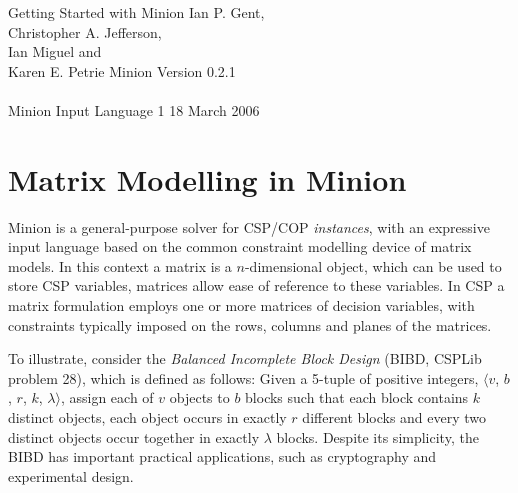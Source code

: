 \documentclass{article}
\begin{document}

\newpage

\pagestyle{empty}
\begin{center}
\vfill
{\LARGE Getting Started with {\sc Minion}}
\vfill
{\large Ian P. Gent,\\
Christopher A. Jefferson,\\
Ian Miguel and\\
Karen E. Petrie}
\vfill
{\Large {\sc Minion} Version 0.2.1}\\
~\\
{\Large {\sc Minion} Input Language 1}
\vfill
{\large 18 March 2006}
\vfill
\end{center}

\newpage

\pagestyle{empty}
\setcounter{page}{1}
\pagestyle{plain}

\tableofcontents

\newpage
\setcounter{page}{1}
\pagestyle{headings}

\section{Matrix Modelling in {\sc Minion}}\label{sect_matrix}

{\sc Minion} is a general-purpose solver for CSP/COP {\em instances},
with an expressive input language based on the common constraint
modelling device of matrix models. In this context a matrix is a
$n$-dimensional object, which can be used to store CSP variables,
matrices allow ease of reference to these variables. In CSP a matrix
formulation employs one or more matrices of decision variables, with
constraints typically imposed on the rows, columns and planes of the
matrices.

To illustrate, consider the {\em Balanced Incomplete Block Design}
(BIBD, CSPLib problem 28), which is defined as follows: Given a
5-tuple of positive integers, $\langle v$, $b$, $r$, $k$,
$\lambda\rangle$, assign each of $v$ objects to $b$ blocks such that
each block contains $k$ distinct objects, each object occurs in
exactly $r$ different blocks and every two distinct objects occur
together in exactly $\lambda$ blocks. Despite its simplicity, the BIBD
has important practical applications, such as cryptography and
experimental design.
\end{document}
